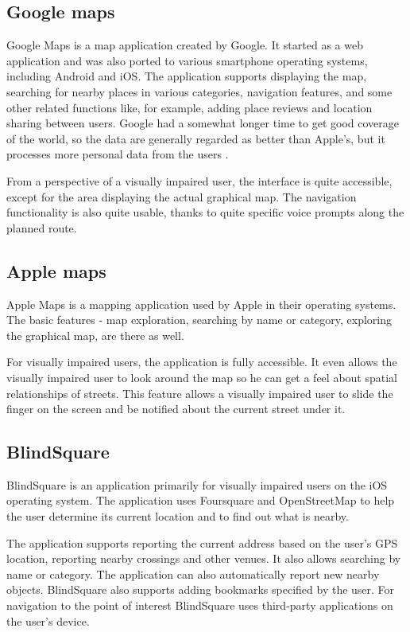 \documentclass[nolof,digital]{fithesis3}
\begin{document}
\subsection{Google maps}
Google Maps \parencite{googlemaps} is a map application created by Google. It started as a web application and was also ported to various smartphone operating systems, including Android and iOS. The application supports displaying the map, searching for nearby places in various categories, navigation features, and some other related functions like, for example, adding place reviews and location sharing between users. Google had a somewhat longer time to get good coverage of the world, so the data are generally regarded as better than Apple's, but it processes more personal data from the users \parencite{mapcomp}.

From a perspective of a visually impaired user, the interface is quite accessible, except for the area displaying the actual graphical map. The navigation functionality is also quite usable, thanks to quite specific voice prompts along the planned route.
\subsection{Apple maps}
Apple Maps \parencite{applemaps} is a mapping application used by Apple in their operating systems. The basic features - map exploration, searching by name or category, exploring the graphical map, are there as well.

For visually impaired users, the application is fully accessible. It even allows the visually impaired user to look around the map so he can get a feel about spatial relationships of streets. This feature allows a visually impaired user to slide the finger on the screen and be notified about the current street under it.
\subsection{BlindSquare}
BlindSquare \parencite{blindsquare} is an application primarily for visually impaired users on the iOS operating system. The application uses Foursquare and OpenStreetMap to help the user determine its current location and to find out what is nearby.

The application supports reporting the current address based on the user's GPS location, reporting nearby crossings and other venues. It also allows searching by name or category. The application can also automatically report new nearby objects. BlindSquare also supports adding bookmarks specified by the user. For navigation to the point of interest BlindSquare uses third-party applications on the user's device.
\end{document}
